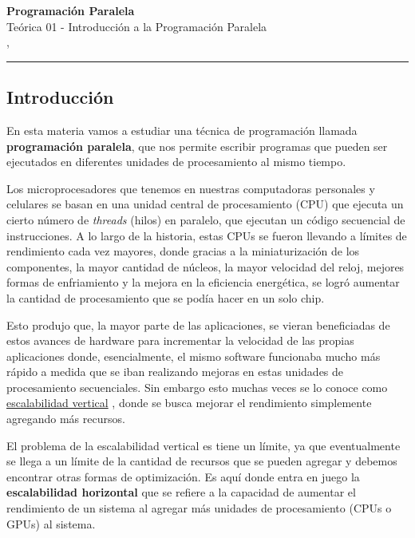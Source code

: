 



\begin{center}
    \LARGE\textbf{Programación Paralela} \\
    \Large{Teórica 01 - Introducción a la Programación Paralela} \\
    \normalsize{\currentsemester, \currentyear} \\
    \vspace{1em}
    \hrule
\end{center}

\vspace{1em}

\setcounter{section}{1}

\subsection{Introducción}
\label{sec:introduccion}

En esta materia vamos a estudiar una técnica de programación llamada \textbf{programación paralela}, que nos permite
escribir programas que pueden ser ejecutados en diferentes unidades de procesamiento al mismo tiempo.

Los microprocesadores que tenemos en nuestras computadoras personales y celulares se basan en una unidad central de
procesamiento (CPU) que ejecuta un cierto número de \textit{threads} (hilos) en paralelo, que ejecutan un código
secuencial de instrucciones. A lo largo de la historia, estas CPUs se fueron llevando a límites de rendimiento cada vez
mayores, donde gracias a la miniaturización de los componentes, la mayor cantidad de núcleos, la mayor velocidad del
reloj, mejores formas de enfriamiento y la mejora en la eficiencia energética, se logró aumentar la cantidad de
procesamiento que se podía hacer en un solo chip.

Esto produjo que, la mayor parte de las aplicaciones, se vieran beneficiadas de estos avances de hardware para
incrementar la velocidad de las propias aplicaciones donde, esencialmente, el mismo software funcionaba mucho más rápido
a medida que se iban realizando mejoras en estas unidades de procesamiento secuenciales. Sin embargo esto muchas veces
se lo conoce como \href{https://es.wikipedia.org/wiki/Escalabilidad#Escalabilidad_vertical}{escalabilidad vertical} ,
donde se busca mejorar el rendimiento simplemente agregando más recursos.

El problema de la escalabilidad vertical es tiene un límite, ya que eventualmente se llega a un límite de la cantidad
de recursos que se pueden agregar y debemos encontrar otras formas de optimización. Es aquí donde entra en juego la
\textbf{escalabilidad horizontal} que se refiere a la capacidad de aumentar el rendimiento de un sistema al agregar más
unidades de procesamiento (CPUs o GPUs) al sistema.

